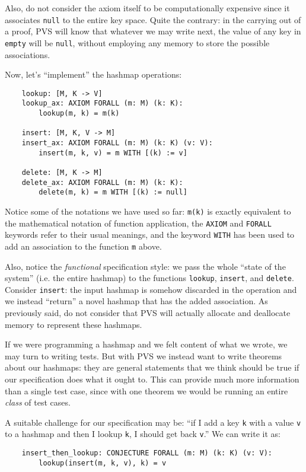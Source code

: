Also, do not consider the axiom itself to be computationally expensive since it associates \texttt{null} to the entire key space.
Quite the contrary: in the carrying out of a proof, PVS will know that whatever we may write next, the value of any key in \texttt{empty} will be \texttt{null}, without employing any memory to store the possible associations.

Now, let's ``implement'' the hashmap operations:

\begin{verbatim}
	lookup: [M, K -> V]
	lookup_ax: AXIOM FORALL (m: M) (k: K):
	    lookup(m, k) = m(k)
	
	insert: [M, K, V -> M]
	insert_ax: AXIOM FORALL (m: M) (k: K) (v: V):
	    insert(m, k, v) = m WITH [(k) := v]
	
	delete: [M, K -> M]
	delete_ax: AXIOM FORALL (m: M) (k: K):
	    delete(m, k) = m WITH [(k) := null]
\end{verbatim}

Notice some of the notations we have used so far: \texttt{m(k)} is exactly equivalent to the mathematical notation of function application, the \texttt{AXIOM} and \texttt{FORALL} keywords refer to their usual meanings, and the keyword \texttt{WITH} has been used to add an association to the function \texttt{m} above.

Also, notice the \emph{functional} specification style: we pass the whole ``state of the system'' (i.e. the entire hashmap) to the functions \texttt{lookup}, \texttt{insert}, and \texttt{delete}.
Consider \texttt{insert}: the input hashmap is somehow discarded in the operation and we instead ``return'' a novel hashmap that has the added association.
As previously said, do not consider that PVS will actually allocate and deallocate memory to represent these hashmaps.

If we were programming a hashmap and we felt content of what we wrote, we may turn to writing tests.
But with PVS we instead want to write theorems about our hashmaps: they are general statements that we think should be true if our specification does what it ought to.
This can provide much more information than a single test case, since with one theorem we would be running an entire \emph{class} of test cases.

A suitable challenge for our specification may be: ``if I add a key \texttt{k} with a value \texttt{v} to a hashmap and then I lookup \texttt{k}, I should get back \texttt{v}.''
We can write it as:

\begin{verbatim}
	insert_then_lookup: CONJECTURE FORALL (m: M) (k: K) (v: V):
	    lookup(insert(m, k, v), k) = v
\end{verbatim}

